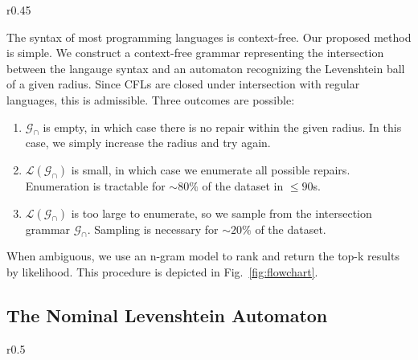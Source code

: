 \documentclass[sigplan,review,anonymous,acmsmall]{acmart}\settopmatter{printfolios=false,printccs=false,printacmref=false}
\begin{document}
\begin{wrapfigure}{r}{0.45\textwidth}
\begin{center}
{
      }
    \end{center}
    \caption{Flowchart of our proposed method.}\label{fig:flowchart}
    \vspace{-1.5cm}
  \end{wrapfigure}

  The syntax of most programming languages is context-free. Our proposed method is simple. We construct a context-free grammar representing the intersection between the langauge syntax and an automaton recognizing the Levenshtein ball of a given radius. Since CFLs are closed under intersection with regular languages, this is admissible. Three outcomes are possible:

  \begin{enumerate}
    \item $\mathcal{G}_\cap$ is empty, in which case there is no repair within the given radius. In this case, we simply increase the radius and try again.
    \item $\mathcal{L}(\mathcal{G}_\cap)$ is small, in which case we enumerate all possible repairs. Enumeration is tractable for $\sim 80\%$ of the dataset in $\leq 90$s.
    \item $\mathcal{L}(\mathcal{G}_\cap)$ is too large to enumerate, so we sample from the intersection grammar $\mathcal{G}_\cap$. Sampling is necessary for $\sim20\%$ of the dataset.
  \end{enumerate}

  When ambiguous, we use an n-gram model to rank and return the top-k results by likelihood. This procedure is depicted in Fig.~\ref{fig:flowchart}.

  \pagebreak\subsection{The Nominal Levenshtein Automaton}

  \begin{wrapfigure}{r}{0.5\textwidth}
    \vspace{-0.3cm}
    \begin{center}
      
    \end{center}
    \caption{NFA recognizing Levenshtein $\Delta(\sigma: \Sigma^5, 3)$.}\label{fig:lev_nfa}
    \vspace{-0.5cm}
  \end{wrapfigure}
\end{document}
